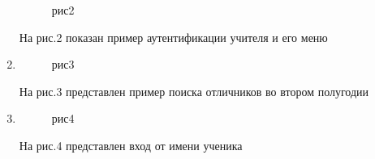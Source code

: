 \documentclass[12pt,a4paper]{report}
\begin{document}
\begin{enumerate}
\begin{figure}[h!]
\caption{рис2}
\label{fig:image}
\end{figure}
На рис.2 показан пример аутентификации учителя и его меню \newpage
\item
\begin{figure}[h!]
\caption{рис3}
\label{fig:image}
\end{figure}
На рис.3 представлен пример поиска отличников во втором полугодии
\item
\begin{figure}[h!]
\caption{рис4}
\label{fig:image}
\end{figure}
На рис.4 представлен вход от имени ученика
\end{enumerate} 
\end{document}
